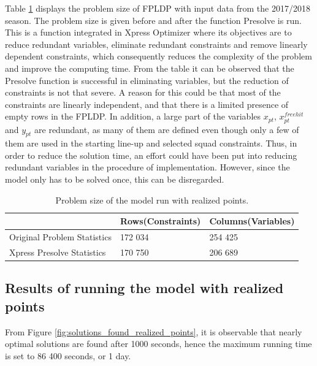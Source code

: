 Table \ref{tab:computational_statistics} displays the problem size of FPLDP with input data from the 2017/2018 season. The problem size is given before and after the function Presolve is run. This is a function integrated in Xpress Optimizer where its objectives are to reduce redundant variables, eliminate redundant constraints and remove linearly dependent constraints, which consequently reduces the complexity of the problem and improve the computing time. From the table it can be observed that the Presolve function is successful in eliminating variables, but the reduction of constraints is not that severe. A reason for this could be that most of the constraints are linearly independent, and that there is a limited presence of empty rows in the FPLDP. In addition, a large part of the variables $x_{pt}$, $x_{pt}^{freehit}$ and $y_{pt}$ are redundant, as many of them are defined even though only a few of them are used in the starting line-up and selected squad constraints. Thus, in order to reduce the solution time, an effort could have been put into reducing redundant variables in the procedure of implementation. However, since the model only has to be solved once, this can be disregarded. 


\begin{table}[H]
\centering
\begin{tabular}{@{}lll@{}}
\toprule
                            & Rows(Constraints)    & Columns(Variables) 
                            \\ \midrule
Original Problem Statistics & 172 034 & 254 425   \\
Xpress Presolve Statistics  & 170 750 & 206 689   \\ 
\bottomrule
\end{tabular}
\caption{Problem size of the model run with realized points.}
\label{tab:computational_statistics}
\end{table}


\subsection{Results of running the model with realized points}



From Figure \ref{fig:solutions_found_realized_points}, it is observable that nearly optimal solutions are found after 1000 seconds, hence the maximum running time is set to 86 400 seconds, or 1 day. 

